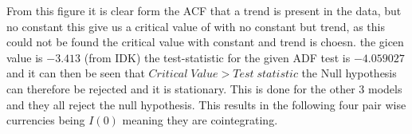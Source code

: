 From this figure it is clear form the ACF that a trend is present in the data, but no constant this give us a critical value of with no constant but trend, as this could not be found the critical value with constant and trend is choesn. the gicen value is $-3.413$ (from IDK) the test-statistic for the given ADF test is $-4.059027$ and it can then be seen that $Critical\; Value>Test\;statistic$ the Null hypothesis can therefore be rejected and it is stationary. This is done for the other 3 models and they all reject the null hypothesis. This results in the following four pair wise currencies being $I(0)$ meaning they are cointegrating. 













